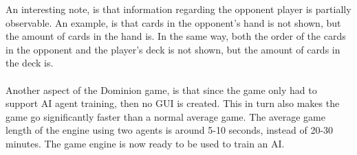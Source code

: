 An interesting note, is that information regarding the opponent player is partially observable. An example, is that cards in the opponent's hand is not shown, but the amount of cards in the hand is. In the same way, both the order of the cards in the opponent and the player's deck is not shown, but the amount of cards in the deck is.\\\\
Another aspect of the Dominion game, is that since the game only had to support AI agent training, then no GUI is created. This in turn also makes the game go significantly faster than a normal average game. The average game length of the engine using two agents is around 5-10 seconds, instead of 20-30 minutes. The game engine is now ready to be used to train an AI.